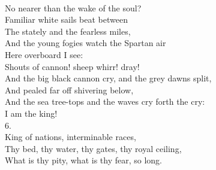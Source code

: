 \documentclass[smalldemyvopaper,11pt,twoside,onecolumn,openright,extrafontsizes]{memoir}
\begin{document}
\\No nearer than the wake of the soul?
\\Familiar white sails beat between
\\The stately and the fearless miles,
\\And the young fogies watch the Spartan air
\\Here overboard I see:
\\Shouts of cannon! sheep whirr! dray!
\\And the big black cannon cry, and the grey dawns split,
\\And pealed far off shivering below,
\\And the sea tree-tops and the waves cry forth the cry:
\\I am the king!
\\6.
\\King of nations, interminable races,
\\Thy bed, thy water, thy gates, thy royal ceiling,
\\What is thy pity, what is thy fear, so long.
\end{document}
